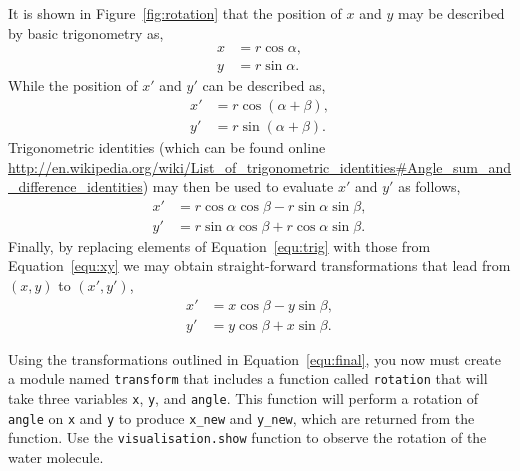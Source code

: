 \documentclass[a4paper]{article}
\begin{document}
It is shown in Figure~\ref{fig:rotation} that the position of $x$ and $y$ may be described by basic trigonometry as, 
%
\begin{equation}
  \begin{aligned}
    x & = r \cos{\alpha}, \\
    y & = r \sin{\alpha}.
  \end{aligned}
\label{equ:xy}
\end{equation}
%
While the position of $x'$ and $y'$ can be described as,
%
\begin{equation}
  \begin{aligned}
    x' & = r \cos{(\alpha + \beta)}, \\
    y' & = r \sin{(\alpha + \beta)}.
  \end{aligned}
\end{equation}
%
Trigonometric identities (which can be found online \url{http://en.wikipedia.org/wiki/List_of_trigonometric_identities#Angle_sum_and_difference_identities}) may then be used to evaluate $x'$ and $y'$ as follows, 
%
\begin{equation}
  \begin{aligned}
    x' & = r \cos{\alpha}\cos{\beta} - r\sin{\alpha}\sin{\beta}, \\
    y' & = r \sin{\alpha}\cos{\beta} + r\cos{\alpha}\sin{\beta}.
  \end{aligned}
\label{equ:trig}
\end{equation}
%
Finally, by replacing elements of Equation~\ref{equ:trig} with those from Equation~\ref{equ:xy} we may obtain straight-forward transformations that lead from $(x, y)$ to $(x', y')$, 
%
\begin{equation}
  \begin{aligned}
    x' & = x\cos{\beta} - y\sin{\beta}, \\
    y' & = y\cos{\beta} + x\sin{\beta}.
  \end{aligned}
\label{equ:final}
\end{equation}
%

Using the transformations outlined in Equation~\ref{equ:final}, you now must create a module named \texttt{transform} that includes a function called \texttt{rotation} that will take three variables \texttt{x}, \texttt{y}, and \texttt{angle}.
This function will perform a rotation of \texttt{angle} on \texttt{x} and \texttt{y} to produce \texttt{x\_new} and \texttt{y\_new}, which are returned from the function. 
Use the \texttt{visualisation.show} function to observe the rotation of the water molecule. 

%
%
\end{document}
